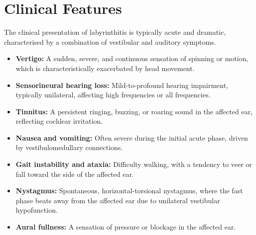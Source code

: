 \section*{Clinical Features}
The clinical presentation of labyrinthitis is typically acute and dramatic, characterised by a combination of vestibular and auditory symptoms.
\begin{itemize}
    \item \textbf{Vertigo:} A sudden, severe, and continuous sensation of spinning or motion, which is characteristically exacerbated by head movement.
    \item \textbf{Sensorineural hearing loss:} Mild-to-profound hearing impairment, typically unilateral, affecting high frequencies or all frequencies.
    \item \textbf{Tinnitus:} A persistent ringing, buzzing, or roaring sound in the affected ear, reflecting cochlear irritation.
    \item \textbf{Nausea and vomiting:} Often severe during the initial acute phase, driven by vestibulomedullary connections.
    \item \textbf{Gait instability and ataxia:} Difficulty walking, with a tendency to veer or fall toward the side of the affected ear.
    \item \textbf{Nystagmus:} Spontaneous, horizontal-torsional nystagmus, where the fast phase beats away from the affected ear due to unilateral vestibular hypofunction.
    \item \textbf{Aural fullness:} A sensation of pressure or blockage in the affected ear.
\end{itemize}

